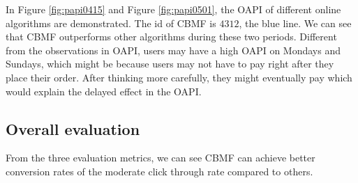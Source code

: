 In Figure \ref{fig:papi0415} and Figure \ref{fig:papi0501}, the OAPI of different online algorithms are demonstrated. The id of CBMF is $4312$, the blue line. We can see that CBMF outperforms other algorithms during these two periods. Different from the observations in OAPI, users may have a high OAPI on Mondays and Sundays, which might be because users may not have to pay right after they place their order. After thinking more carefully, they might eventually pay which would explain the delayed effect in the OAPI.

\subsection*{Overall evaluation}
From the three evaluation metrics, we can see CBMF can achieve better conversion rates of the moderate click through rate compared to others.
